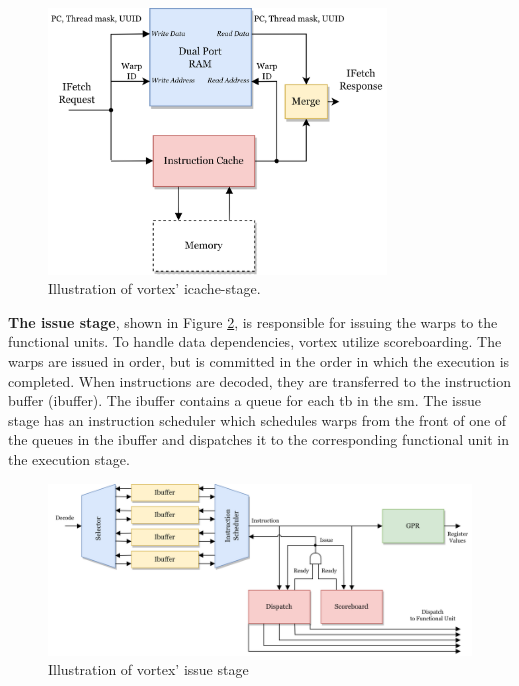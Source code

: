 \begin{figure}
    \centering
    \includegraphics[width=0.8\textwidth]{figures/Baseline Icache-stage.png}
    \caption{Illustration of \Gls{vortex}' icache-stage.}
    \label{fig:baseline_icache_stage}
\end{figure}

\vspace{1mm}\noindent
\textbf{The issue stage}, shown in Figure \ref{fig:baseline_issue_stage}, is responsible for issuing the warps to the functional units. To handle data dependencies, \Gls{vortex} utilize scoreboarding. The warps are issued in order, but is committed in the order in which the execution is completed. When instructions are decoded, they are transferred to the instruction buffer (ibuffer). The ibuffer contains a queue for each \acrshort{tb} in the \acrshort{sm}. The issue stage has an instruction scheduler which schedules warps from the front of one of the queues in the ibuffer and dispatches it to the corresponding functional unit in the execution stage.

\begin{figure}
    \centering
    \includegraphics[width=\textwidth]{figures/Baseline Issue Stage.png}
    \caption{Illustration of \Gls{vortex}' issue stage}
    \label{fig:baseline_issue_stage}
\end{figure}

